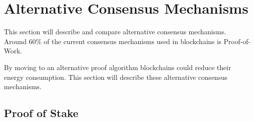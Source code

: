 
\section{Alternative Consensus Mechanisms}\label{sec:alternative-consensus-mechanisms}
This section will describe and compare alternative consensus mechanisms.
Around 60\% of the current consensus mechanisms used in blockchains is Proof-of-Work.\cite{overview-of-sustainablity-blockchains}

By moving to an alternative proof algorithm blockchains could reduce their energy consumption.
This section will describe these alternative consensus mechanisms.\cite{4-ways-to-counter-blockchains-energy-consumption}

\subsection{Proof of Stake}\label{subsec:proof-of-stake}

